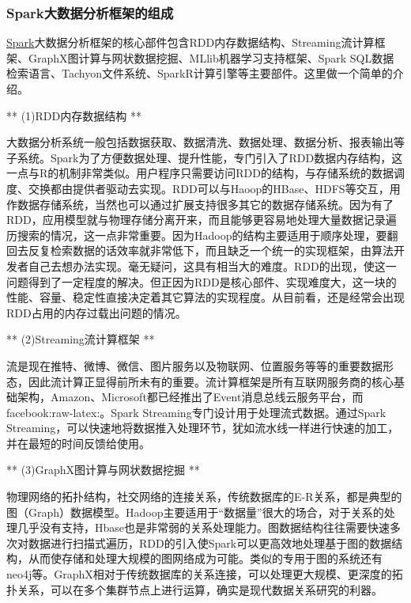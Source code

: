 \documentclass[letterpaper,10pt,english]{sphinxmanual}
\begin{document}
\subsubsection{Spark大数据分析框架的组成}
\label{gispark_paas:Spark_u5927_u6570_u636e_u5206_u6790_u6846_u67b6_u7684_u7ec4_u6210}
\href{http://spark.apache.org}{Spark}大数据分析框架的核心部件包含RDD内存数据结构、Streaming流计算框架、GraphX图计算与网状数据挖掘、MLlib机器学习支持框架、Spark
SQL数据检索语言、Tachyon文件系统、SparkR计算引擎等主要部件。这里做一个简单的介绍。

** (1)RDD内存数据结构 **

大数据分析系统一般包括数据获取、数据清洗、数据处理、数据分析、报表输出等子系统。Spark为了方便数据处理、提升性能，专门引入了RDD数据内存结构，这一点与R的机制非常类似。用户程序只需要访问RDD的结构，与存储系统的数据调度、交换都由提供者驱动去实现。RDD可以与Haoop的HBase、HDFS等交互，用作数据存储系统，当然也可以通过扩展支持很多其它的数据存储系统。因为有了RDD，应用模型就与物理存储分离开来，而且能够更容易地处理大量数据记录遍历搜索的情况，这一点非常重要。因为Hadoop的结构主要适用于顺序处理，要翻回去反复检索数据的话效率就非常低下，而且缺乏一个统一的实现框架，由算法开发者自己去想办法实现。毫无疑问，这具有相当大的难度。RDD的出现，使这一问题得到了一定程度的解决。但正因为RDD是核心部件、实现难度大，这一块的性能、容量、稳定性直接决定着其它算法的实现程度。从目前看，还是经常会出现RDD占用的内存过载出问题的情况。

** (2)Streaming流计算框架 **

流是现在推特、微博、微信、图片服务以及物联网、位置服务等等的重要数据形态，因此流计算正显得前所未有的重要。流计算框架是所有互联网服务商的核心基础架构，Amazon、Microsoft都已经推出了Event消息总线云服务平台，而facebook:raw-latex:。Spark
Streaming专门设计用于处理流式数据。通过Spark
Streaming，可以快速地将数据推入处理环节，犹如流水线一样进行快速的加工，并在最短的时间反馈给使用。

** (3)GraphX图计算与网状数据挖掘 **

物理网络的拓扑结构，社交网络的连接关系，传统数据库的E-R关系，都是典型的图（Graph）数据模型。Hadoop主要适用于“数据量”很大的场合，对于关系的处理几乎没有支持，Hbase也是非常弱的关系处理能力。图数据结构往往需要快速多次对数据进行扫描式遍历，RDD的引入使Spark可以更高效地处理基于图的数据结构，从而使存储和处理大规模的图网络成为可能。类似的专用于图的系统还有neo4j等。GraphX相对于传统数据库的关系连接，可以处理更大规模、更深度的拓扑关系，可以在多个集群节点上进行运算，确实是现代数据关系研究的利器。
\end{document}
